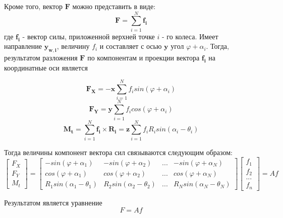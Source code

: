 \documentclass[oneside,final,14pt]{extreport}
\newcommand{\bs}{\boldsymbol}
\begin{document}
Кроме того, вектор $\bs{F}$ можно представить в  виде:
\begin{equation}
\bs{F}
=
\sum_{i=1}^{N}\bs{f_{i}}
\end{equation}
где $\bs{f_{i}}$ - вектор силы, приложенной верхней точке $i$ - го колеса. Имеет направление $\bs{y_{w,i}}$, величину $f_{i}$ и составляет с осью $\bs{y}$ угол $\varphi + \alpha_{i}$.  
Тогда, результатом разложения $\bs{F}$ по компонентам и проекции вектора $\bs{f_{i}}$ на координатные оси является

\begin{equation}
\bs{F_{X}}
=
-
\bs{x}
\sum_{i=1}^{N}f_{i} sin(\varphi +\alpha_{i})
\end{equation}
\begin{equation}
\bs{F_{Y}}
=
\bs{y}
\sum_{i=1}^{N}f_{i} cos(\varphi +\alpha_{i})
\end{equation}
\begin{equation}
\label{eq:rot_force}
\bs{M_{t}}
=
\sum_{i=1}^{N}\bs{f_{i}}\times\bs{R_{i}}
=
\bs{z}
\sum_{i=1}^{N}f_{i}R_{i}sin(\alpha_{i} - \theta_{i})
\end{equation}



Тогда величины компонент вектора сил связываются следующим образом:
\begin{equation}
\begin{bmatrix}
F_{X} \\
F_{Y} \\
M_{t}
\end{bmatrix}
=
\begin{bmatrix}
-sin(\varphi + \alpha_{1}) &
-sin(\varphi + \alpha_{2}) &
...              &
-sin(\varphi + \alpha_{N}) \\
cos(\varphi + \alpha_{1}) &
cos(\varphi + \alpha_{2}) &
...              &
cos(\varphi + \alpha_{N}) \\ 
R_{1}sin(\alpha_{1} - \theta_{1}) &
R_{2}sin(\alpha_{2} - \theta_{2}) &
 ... &
R_{N}sin(\alpha_{N} - \theta_{N})
\end{bmatrix}
\begin{bmatrix}
f_{1} \\
f_{2} \\
...   \\
f_{n}
\end{bmatrix}
=
Af
\end{equation}

Результатом является уравнение
\begin{equation}
F = Af
\label{eq:f}
\end{equation}
\end{document}
